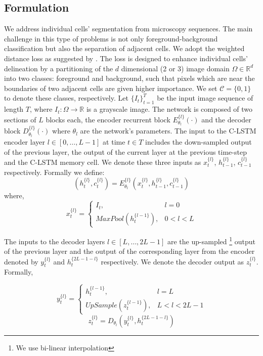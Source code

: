 \documentclass{article}
\begin{document}
 \subsection{Formulation}\label{subsec:Formulation} 
We address individual cells' segmentation from microscopy sequences. The main challenge in this type of problems is not only foreground-background classification but also the separation of adjacent cells. We adopt the  weighted distance loss as suggested by \cite{Ronneberger15}. The loss is designed to enhance individual cells' delineation by a partitioning of the $d$ dimensional (2 or 3) image domain $\Omega \in \mathbb{R}^{d}$ into two classes: foreground and background, such that pixels which are near the boundaries of two adjacent cells are given higher importance.
We set $\mathcal{C} = \{0,1\}$  to denote these classes, respectively. Let $\{I_t\}_{t=1} ^{T}$ be the input image sequence of length $T$, where $I_t: \Omega\rightarrow \mathbb{R} $ is a grayscale image. 
The network is composed of two sections of $L$ blocks each, the encoder recurrent block $E_{\theta_l}^{\{l\}}(\cdot)$ and the decoder block  $D_{\theta_l}^{\{l\}}(\cdot)$ where $\theta_l$ are the network's parameters. 
The input to the C-LSTM encoder layer $l\in [0,\ldots,L-1]$ at time $t\in T$ includes the down-sampled output of the previous layer, the output of the current layer at the previous time-step and the C-LSTM memory cell. We denote these three inputs as $x_t^{\{l\}}$, $h_{t-1}^{\{l\}}$, $c_{t-1}^{\{l\}}$ respectively. Formally we define: 
\begin{equation}
(h_{t}^{\{l\}}, c_{t}^{\{l\}})=E_{\theta_l}^{\{l\}}(x_t^{\{l\}}, h_{t-1}^{\{l\}}, c_{t-1}^{\{l\}})
\end{equation}
where,
\begin{equation}
    x_t^{\{l\}}= 
\begin{cases}
    I_t,&  l=0\\
    MaxPool(h_t^{\{l-1\}}), & 0<l<L

\end{cases}
\end{equation}

The inputs to the decoder layers $l\in [L,\ldots,2L-1]$  are the up-sampled \footnote{We use bi-linear interpolation} output of the previous layer and the output of the corresponding layer from the encoder denoted by $y_t^{\{l\}}$ and  $h_t^{\{2L-1-l\}}$ respectively. We denote the decoder output as $z_{t}^{\{l\}}$. Formally,


\begin{equation}
    y_t^{\{l\}}= 
\begin{cases}
    h_t^{\{l-1\}},&  l=L\\
    UpSample(z_t^{\{l-1\}}), & L<l<2L-1

\end{cases}
\end{equation}
\begin{equation}
z_t^{\{l\}} = D_{\theta_l}(y_t^{\{l\}}, h_t^{\{2L-1-l\}})
\end{equation}
\end{document}

